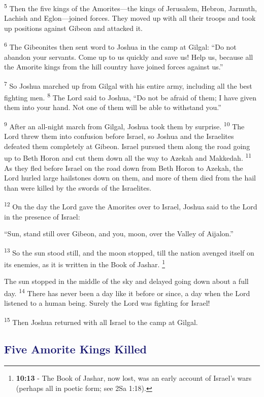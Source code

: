 \documentclass[12pt,twoside]{article}
\newcommand{\vs}[1]{\textsuperscript{#1}}
\newcommand{\vnote}[2]{%
  \begingroup
  \renewcommand\thefootnote{}%
  \footnote{\scriptsize \textbf{}#2}%
  \addtocounter{footnote}{-1}%
  \endgroup
}
\begin{document}
\vs{5} Then the five kings of the Amorites---the kings of Jerusalem, Hebron, Jarmuth, Lachish and Eglon---joined forces. They moved up with all their troops and took up positions against Gibeon and attacked it.

\vs{6} The Gibeonites then sent word to Joshua in the camp at Gilgal: ``Do not abandon your servants. Come up to us quickly and save us! Help us, because all the Amorite kings from the hill country have joined forces against us.''

\vs{7} So Joshua marched up from Gilgal with his entire army, including all the best fighting men.
\vs{8} The Lord said to Joshua, ``Do not be afraid of them; I have given them into your hand. Not one of them will be able to withstand you.''

\vs{9} After an all-night march from Gilgal, Joshua took them by surprise.
\vs{10} The Lord threw them into confusion before Israel, so Joshua and the Israelites defeated them completely at Gibeon. Israel pursued them along the road going up to Beth Horon and cut them down all the way to Azekah and Makkedah.
\vs{11} As they fled before Israel on the road down from Beth Horon to Azekah, the Lord hurled large hailstones down on them, and more of them died from the hail than were killed by the swords of the Israelites.

\vs{12} On the day the Lord gave the Amorites over to Israel, Joshua said to the Lord in the presence of Israel:

``Sun, stand still over Gibeon, and you, moon, over the Valley of Aijalon.''

\vs{13} So the sun stood still, and the moon stopped, till the nation avenged itself on its enemies, as it is written in the Book of Jashar.\vnote{13}{\textbf{10:13} - The Book of Jashar, now lost, was an early account of Israel’s wars (perhaps all in poetic form; see 2Sa 1:18).}

The sun stopped in the middle of the sky and delayed going down about a full day.
\vs{14} There has never been a day like it before or since, a day when the Lord listened to a human being. Surely the Lord was fighting for Israel!

\vs{15} Then Joshua returned with all Israel to the camp at Gilgal.

\subsection*{\textcolor{MidnightBlue}{\textbf{Five Amorite Kings Killed}}}
\end{document}
